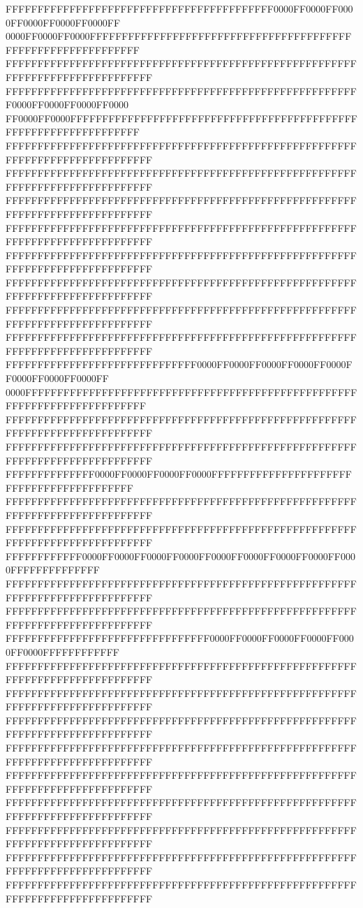 FFFFFFFFFFFFFFFFFFFFFFFFFFFFFFFFFFFFFFFFFF0000FF0000FF0000FF0000FF0000FF0000FF
0000FF0000FF0000FFFFFFFFFFFFFFFFFFFFFFFFFFFFFFFFFFFFFFFFFFFFFFFFFFFFFFFFFFFFFF
FFFFFFFFFFFFFFFFFFFFFFFFFFFFFFFFFFFFFFFFFFFFFFFFFFFFFFFFFFFFFFFFFFFFFFFFFFFFFF
FFFFFFFFFFFFFFFFFFFFFFFFFFFFFFFFFFFFFFFFFFFFFFFFFFFFFFFF0000FF0000FF0000FF0000
FF0000FF0000FFFFFFFFFFFFFFFFFFFFFFFFFFFFFFFFFFFFFFFFFFFFFFFFFFFFFFFFFFFFFFFFFF
FFFFFFFFFFFFFFFFFFFFFFFFFFFFFFFFFFFFFFFFFFFFFFFFFFFFFFFFFFFFFFFFFFFFFFFFFFFFFF
FFFFFFFFFFFFFFFFFFFFFFFFFFFFFFFFFFFFFFFFFFFFFFFFFFFFFFFFFFFFFFFFFFFFFFFFFFFFFF
FFFFFFFFFFFFFFFFFFFFFFFFFFFFFFFFFFFFFFFFFFFFFFFFFFFFFFFFFFFFFFFFFFFFFFFFFFFFFF
FFFFFFFFFFFFFFFFFFFFFFFFFFFFFFFFFFFFFFFFFFFFFFFFFFFFFFFFFFFFFFFFFFFFFFFFFFFFFF
FFFFFFFFFFFFFFFFFFFFFFFFFFFFFFFFFFFFFFFFFFFFFFFFFFFFFFFFFFFFFFFFFFFFFFFFFFFFFF
FFFFFFFFFFFFFFFFFFFFFFFFFFFFFFFFFFFFFFFFFFFFFFFFFFFFFFFFFFFFFFFFFFFFFFFFFFFFFF
FFFFFFFFFFFFFFFFFFFFFFFFFFFFFFFFFFFFFFFFFFFFFFFFFFFFFFFFFFFFFFFFFFFFFFFFFFFFFF
FFFFFFFFFFFFFFFFFFFFFFFFFFFFFFFFFFFFFFFFFFFFFFFFFFFFFFFFFFFFFFFFFFFFFFFFFFFFFF
FFFFFFFFFFFFFFFFFFFFFFFFFFFFFF0000FF0000FF0000FF0000FF0000FF0000FF0000FF0000FF
0000FFFFFFFFFFFFFFFFFFFFFFFFFFFFFFFFFFFFFFFFFFFFFFFFFFFFFFFFFFFFFFFFFFFFFFFFFF
FFFFFFFFFFFFFFFFFFFFFFFFFFFFFFFFFFFFFFFFFFFFFFFFFFFFFFFFFFFFFFFFFFFFFFFFFFFFFF
FFFFFFFFFFFFFFFFFFFFFFFFFFFFFFFFFFFFFFFFFFFFFFFFFFFFFFFFFFFFFFFFFFFFFFFFFFFFFF
FFFFFFFFFFFFFF0000FF0000FF0000FF0000FFFFFFFFFFFFFFFFFFFFFFFFFFFFFFFFFFFFFFFFFF
FFFFFFFFFFFFFFFFFFFFFFFFFFFFFFFFFFFFFFFFFFFFFFFFFFFFFFFFFFFFFFFFFFFFFFFFFFFFFF
FFFFFFFFFFFFFFFFFFFFFFFFFFFFFFFFFFFFFFFFFFFFFFFFFFFFFFFFFFFFFFFFFFFFFFFFFFFFFF
FFFFFFFFFFFF0000FF0000FF0000FF0000FF0000FF0000FF0000FF0000FF0000FFFFFFFFFFFFFF
FFFFFFFFFFFFFFFFFFFFFFFFFFFFFFFFFFFFFFFFFFFFFFFFFFFFFFFFFFFFFFFFFFFFFFFFFFFFFF
FFFFFFFFFFFFFFFFFFFFFFFFFFFFFFFFFFFFFFFFFFFFFFFFFFFFFFFFFFFFFFFFFFFFFFFFFFFFFF
FFFFFFFFFFFFFFFFFFFFFFFFFFFFFFFF0000FF0000FF0000FF0000FF0000FF0000FFFFFFFFFFFF
FFFFFFFFFFFFFFFFFFFFFFFFFFFFFFFFFFFFFFFFFFFFFFFFFFFFFFFFFFFFFFFFFFFFFFFFFFFFFF
FFFFFFFFFFFFFFFFFFFFFFFFFFFFFFFFFFFFFFFFFFFFFFFFFFFFFFFFFFFFFFFFFFFFFFFFFFFFFF
FFFFFFFFFFFFFFFFFFFFFFFFFFFFFFFFFFFFFFFFFFFFFFFFFFFFFFFFFFFFFFFFFFFFFFFFFFFFFF
FFFFFFFFFFFFFFFFFFFFFFFFFFFFFFFFFFFFFFFFFFFFFFFFFFFFFFFFFFFFFFFFFFFFFFFFFFFFFF
FFFFFFFFFFFFFFFFFFFFFFFFFFFFFFFFFFFFFFFFFFFFFFFFFFFFFFFFFFFFFFFFFFFFFFFFFFFFFF
FFFFFFFFFFFFFFFFFFFFFFFFFFFFFFFFFFFFFFFFFFFFFFFFFFFFFFFFFFFFFFFFFFFFFFFFFFFFFF
FFFFFFFFFFFFFFFFFFFFFFFFFFFFFFFFFFFFFFFFFFFFFFFFFFFFFFFFFFFFFFFFFFFFFFFFFFFFFF
FFFFFFFFFFFFFFFFFFFFFFFFFFFFFFFFFFFFFFFFFFFFFFFFFFFFFFFFFFFFFFFFFFFFFFFFFFFFFF
FFFFFFFFFFFFFFFFFFFFFFFFFFFFFFFFFFFFFFFFFFFFFFFFFFFFFFFFFFFFFFFFFFFFFFFFFFFFFF
